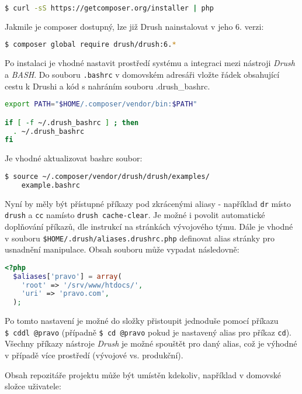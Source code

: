 \begin{lstlisting}[language=bash]
  $ curl -sS https://getcomposer.org/installer | php
\end{lstlisting}

Jakmile je composer dostupný, lze již Drush nainstalovat v jeho 6. verzi:

\begin{lstlisting}[language=bash]
  $ composer global require drush/drush:6.*
\end{lstlisting}

Po instalaci je vhodné nastavit prostředí systému a integraci mezi nástroji \emph{Drush} a \emph{BASH}. Do souboru \texttt{.bashrc} v domovském adresáři vložte řádek obsahující cestu k Drushi a kód s nahráním souboru .drush\_bashrc.

\begin{lstlisting}[language=bash]
export PATH="$HOME/.composer/vendor/bin:$PATH"

if [ -f ~/.drush_bashrc ] ; then
  . ~/.drush_bashrc
fi
\end{lstlisting} 

Je vhodné aktualizovat bashrc soubor:

\begin{lstlisting}[language=bash]
  $ source ~/.composer/vendor/drush/drush/examples/
    example.bashrc
\end{lstlisting} 

Nyní by měly být přístupné příkazy pod zkrácenými aliasy - například \texttt{dr} místo \texttt{drush} a \texttt{cc} namísto \texttt{drush cache-clear}. Je možné i povolit automatické doplňování příkazů, dle instrukcí na stránkách vývojového týmu. Dále je vhodné v souboru \linebreak\texttt{\$HOME/.drush/aliases.drushrc.php} definovat alias stránky pro usnadnění manipulace. Obsah souboru může vypadat následovně:

\begin{lstlisting}[language=php]
  <?php
  $aliases['pravo'] = array(
    'root' => '/srv/www/htdocs/',
    'uri' => 'pravo.com',
  );
\end{lstlisting}

Po tomto nastavení je možné do složky přistoupit jednoduše pomocí příkazu \texttt{\$~cddl~@pravo} (případně \texttt{\$~cd~@pravo} pokud je nastavený alias pro příkaz \texttt{cd}). Všechny příkazy nástroje \emph{Drush} je možné spouštět pro daný alias, což je výhodné v případě více prostředí (vývojové vs. produkční).

Obsah repozitáře projektu může být umístěn kdekoliv, například v domovské složce uživatele:

